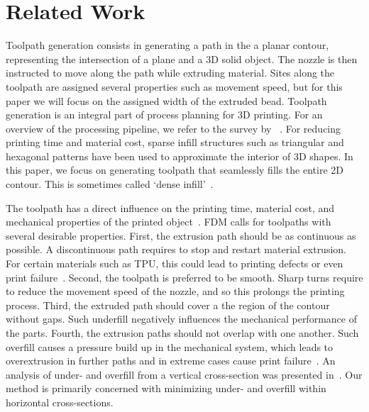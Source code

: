 \section{Related Work}

Toolpath generation consists in generating a path in the a planar contour, representing the intersection of a plane and a 3D solid object.
The nozzle is then instructed to move along the path while extruding material.
Sites along the toolpath are assigned several properties such as movement speed, but for this paper we will focus on the assigned width of the extruded bead.
Toolpath generation is an integral part of process planning for 3D printing.
For an overview of the processing pipeline, we refer to the survey by \citeauthor{Livesu2017CGF}~\cite{Livesu2017CGF}.
For reducing printing time and material cost, sparse infill structures such as triangular and hexagonal patterns have been used to approximate the interior of 3D shapes.
In this paper, we focus on generating toolpath that seamlessly fills the entire 2D contour.
This is sometimes called `dense infill'~\cite{Livesu2017CGF}.

The toolpath has a direct influence on the printing time, material cost, and mechanical properties of the printed object~\cite{N.Turner2014,ahn2002anisotropic}.
FDM calls for toolpaths with several desirable properties.
First, the extrusion path should be as continuous as possible.
A discontinuous path requires to stop and restart material extrusion.
For certain materials such as TPU, this could lead to printing defects or even print failure~\cite{KUIPERS2019CAD}.
Second, the toolpath is preferred to be smooth.
Sharp turns require to reduce the movement speed of the nozzle, and so this prolongs the printing process.
Third, the extruded path should cover a the region of the contour without gaps.
Such underfill negatively influences the mechanical performance of the parts.
Fourth, the extrusion paths should not overlap with one another.
Such overfill causes a pressure build up in the mechanical system, which leads to overextrusion in further paths and in extreme cases cause print failure~\cite{KUIPERS2019CAD}.
An analysis of under- and overfill from a vertical cross-section was presented in~\cite{Han2002JMSE}. 
Our method is primarily concerned with minimizing under- and overfill within horizontal cross-sections.

